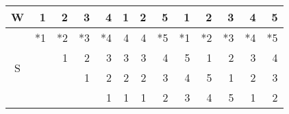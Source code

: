 \documentclass{standalone}
\begin{document}
\begin{tabular}{c|rrrrrrrrrrrr}
W & 1 & 2 & 3 & 4 & 1 & 2 & 5 & 1 & 2 & 3 & 4 & 5 \\
\hline
\multirow{4}{*}{S}
 & *1 & *2 & *3 & *4 &  4 &  4 & *5 & *1 & *2 & *3 & *4 & *5 \\
 &    &  1 &  2 &  3 &  3 &  3 &  4 &  5 &  1 &  2 &  3 &  4 \\
 &    &    &  1 &  2 &  2 &  2 &  3 &  4 &  5 &  1 &  2 &  3 \\
 &    &    &    &  1 &  1 &  1 &  2 &  3 &  4 &  5 &  1 &  2 \\
\end{tabular}
\end{document}

